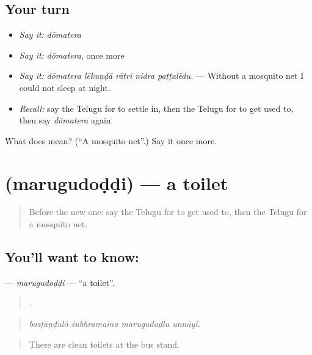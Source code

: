 \subsection*{Your turn}
\begin{itemize}
\raggedright
  \item \emph{Say it:} \emph{dōmatera}
  \item \emph{Say it:} \emph{dōmatera}, once more
  \item \emph{Say it:} \emph{dōmatera lēkuṇḍā rātri nidra paṭṭalēdu.} — Without a mosquito net I could not sleep at night.
  \item \emph{Recall:} say the Telugu for to settle in, then the Telugu for to get used to, then say \emph{dōmatera} again
\end{itemize}

\begin{tcolorbox}[breakable,colback=teal!4,colframe=teal!35!black,title={Before you move on}]
What does  mean? (\textquotedblleft{}A mosquito net\textquotedblright{}.) Say it once more.
\end{tcolorbox}
\section[\texorpdfstring{\te{మరుగుదొడ్డి} (marugudoḍḍi)}{మరుగుదొడ్డి (marugudoḍḍi)}]{ (marugudoḍḍi) — a toilet}

\label{lesson:TE-C458-marugudoddi}



\begin{quote}
Before the new one: say the Telugu for to get used to, then the Telugu for a mosquito net.
\end{quote}

\subsection*{You'll want to know: }
\textbf{} — \emph{marugudoḍḍi} — \textquotedblleft{}a toilet\textquotedblright{}.

\begin{quote}
   .
\end{quote}

\begin{quote}
\emph{basṭāṇḍulō śubhramaina marugudoḍlu unnāyi.}
\end{quote}

\begin{quote}
There are clean toilets at the bus stand.
\end{quote}

